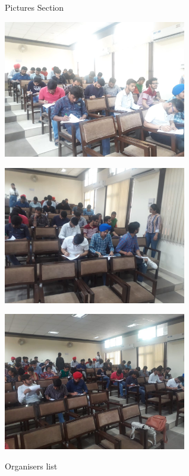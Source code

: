 \documentclass[12pt, a4 paper]{article}
\begin{document}
\begin{center}
\Huge Pictures Section

\medskip

\includegraphics[height=6cm]{image2.jpg}
\medskip

\includegraphics[height=6cm]{image3.jpg}
\medskip

\includegraphics[height=6cm]{image4.jpg}
\begin{center}

\end{center}

\newpage

\huge Organisers list
\end{center}
\end{document}
